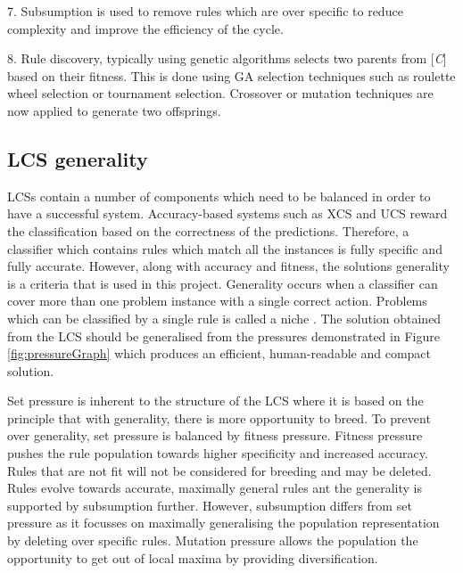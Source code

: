 7.	Subsumption is used to remove rules which are over specific to reduce complexity and improve the efficiency of the cycle. 

8.	Rule discovery, typically using genetic algorithms selects two parents from [\textit{C}] based on their fitness. This is done using GA selection techniques such as roulette wheel selection or tournament selection. Crossover or mutation techniques are now applied to generate two offsprings. 

\subsection{LCS generality}
LCSs contain a number of components which need to be balanced in order to have a successful system. Accuracy-based systems such as XCS and UCS reward the classification based on the correctness of the predictions. Therefore, a classifier which contains rules which match all the instances is fully specific and fully accurate. However, along with accuracy and fitness, the solution\textquotesingle s generality is a criteria that is used in this project. Generality occurs when a classifier can cover more than one problem instance with a single correct action. Problems which can be classified by a single rule is called a niche \cite{urbanowicz2017introduction}. The solution obtained from the LCS should be generalised from the pressures demonstrated in Figure \ref{fig:pressureGraph} which produces an efficient, human-readable and compact solution.

Set pressure is inherent to the structure of the LCS where it is based on the principle that with generality, there is more opportunity to breed. To prevent over generality, set pressure is balanced by fitness pressure. Fitness pressure pushes the rule population towards higher specificity and increased accuracy. Rules that are not fit will not be considered for breeding and may be deleted. Rules evolve towards accurate, maximally general rules ant the generality is supported by subsumption further. However, subsumption differs from set pressure as it focusses on maximally generalising the population representation by deleting over specific rules. Mutation pressure allows the population the opportunity to get out of local maxima by providing diversification. 

